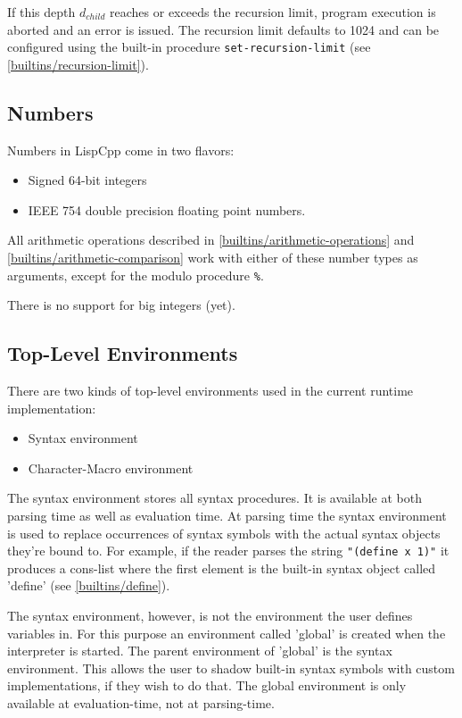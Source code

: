 \documentclass[a4paper]{scrartcl}
\newcommand{\recursionLimit}{1024}
\begin{document}
	If this depth $d_{child}$ reaches or exceeds the recursion limit, program execution is aborted and an error is issued. The recursion limit defaults to \recursionLimit{} and can be configured using the built-in procedure \lstinline|set-recursion-limit| (see \ref{builtins/recursion-limit}).

\subsection{Numbers}
\label{numbers}
	Numbers in LispCpp come in two flavors:
	\begin{itemize}
		\item Signed 64-bit integers
		\item IEEE 754 double precision floating point numbers.
	\end{itemize}

	All arithmetic operations described in \ref{builtins/arithmetic-operations} and \ref{builtins/arithmetic-comparison} work with either of these number types as arguments, except for the modulo procedure \lstinline|%|.

	There is no support for big integers (yet).

\subsection{Top-Level Environments}
\label{env}
	There are two kinds of top-level environments used in the current runtime implementation:
	\begin{itemize}
		\item Syntax environment
		\item Character-Macro environment
	\end{itemize}

	The syntax environment stores all syntax procedures. It is available at both parsing time as well as evaluation time. At parsing time the syntax environment is used to replace occurrences of syntax symbols with the actual syntax objects they're bound to. For example, if the reader parses the string \lstinline|"(define x 1)"| it produces a cons-list where the first element is the built-in syntax object called 'define' (see \ref{builtins/define}).

	The syntax environment, however, is not the environment the user defines variables in. For this purpose an environment called 'global' is created when the interpreter is started. The parent environment of 'global' is the syntax environment. This allows the user to shadow built-in syntax symbols with custom implementations, if they wish to do that. The global environment is only available at evaluation-time, not at parsing-time.
\end{document}
